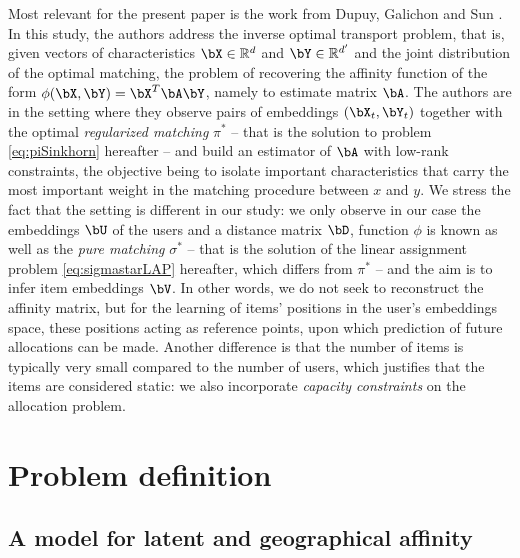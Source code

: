 Most relevant for the present paper is the work from Dupuy, Galichon and Sun
\cite{dupuy_estimating_2016}. In this study, the authors address the inverse
optimal transport problem, that is, given vectors of characteristics $\bX \in
    \mathbb{R}^d$ and $\bY \in \mathbb{R}^{d'}$ and the joint distribution of the
optimal matching, the problem of recovering the affinity function of the form
$\phi(\bX,\bY)=\bX^T \bA \bY$, namely to estimate matrix $\bA$. The authors are
in the setting where they observe pairs of embeddings $(\bX_t,\bY_t)$ together
with the optimal \emph{regularized matching} $\pi^*$ -- that is the solution to
problem \eqref{eq:piSinkhorn} hereafter -- and build an estimator of $\bA$ with
low-rank constraints, the objective being to isolate important characteristics
that carry the most important weight in the matching procedure between $x$ and
$y$. We stress the fact that the setting is different in our study:
we only observe in our case the embeddings $\bU$ of the users and a distance
matrix $\bD$, function $\phi$ is known as well as the \emph{pure matching}
$\sigma^*$ -- that is the solution of the linear assignment problem
\eqref{eq:sigmastarLAP} hereafter, which differs from $\pi^*$ -- and the aim is
to infer item embeddings $\bV$. In other words, we do not seek to reconstruct
the affinity matrix, but for the learning of items' positions in the user's
embeddings space, these positions acting as reference points, upon which
prediction of future allocations can be made. Another difference is that the
number of items is typically very small compared to the number of users, which
justifies that the items are considered static: we also incorporate
\emph{capacity constraints} on the allocation problem.

\section{Problem definition}

\subsection*{A model for latent and geographical affinity}

